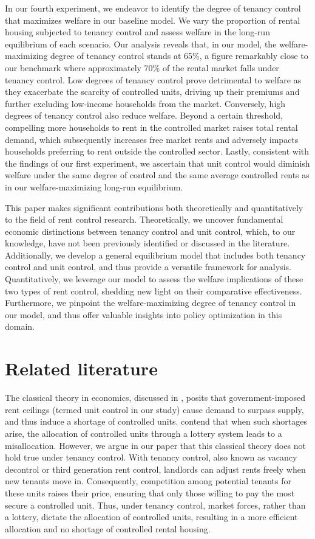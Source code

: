 \documentclass[parskip=full]{article}
\begin{document}
In our fourth experiment, we endeavor to identify the degree of tenancy control that maximizes welfare in our baseline model. We vary the proportion of rental housing subjected to tenancy control and assess welfare in the long-run equilibrium of each scenario. Our analysis reveals that, in our model, the welfare-maximizing degree of tenancy control stands at 65\%, a figure remarkably close to our benchmark where approximately 70\% of the rental market falls under tenancy control. Low degrees of tenancy control prove detrimental to welfare as they exacerbate the scarcity of controlled units, driving up their premiums and further excluding low-income households from the market. Conversely, high degrees of tenancy control also reduce welfare. Beyond a certain threshold, compelling more households to rent in the controlled market raises total rental demand, which subsequently increases free market rents and adversely impacts households preferring to rent outside the controlled sector. Lastly, consistent with the findings of our first experiment, we ascertain that unit control would diminish welfare under the same degree of control and the same average controlled rents as in our welfare-maximizing long-run equilibrium.

This paper makes significant contributions both theoretically and quantitatively to the field of rent control research. Theoretically, we uncover fundamental economic distinctions between tenancy control and unit control, which, to our knowledge, have not been previously identified or discussed in the literature. Additionally, we develop a general equilibrium model that includes both tenancy control and unit control, and thus provide a versatile framework for analysis. Quantitatively, we leverage our model to assess the welfare implications of these two types of rent control, shedding new light on their comparative effectiveness. Furthermore, we pinpoint the welfare-maximizing degree of tenancy control in our model, and thus offer valuable insights into policy optimization in this domain.

\section{Related literature}\label{sec:related_lit}

The classical theory in economics, discussed in \citet{suen-1989}, posits that government-imposed rent ceilings (termed unit control in our study) cause demand to surpass supply, and thus induce a shortage of controlled units. \citet{gl-2003} contend that when such shortages arise, the allocation of controlled units through a lottery system leads to a misallocation. However, we argue in our paper that this classical theory does not hold true under tenancy control. With tenancy control, also known as vacancy decontrol or third generation rent control, landlords can adjust rents freely when new tenants move in. Consequently, competition among potential tenants for these units raises their price, ensuring that only those willing to pay the most secure a controlled unit. Thus, under tenancy control, market forces, rather than a lottery, dictate the allocation of controlled units, resulting in a more efficient allocation and no shortage of controlled rental housing.
\end{document}
